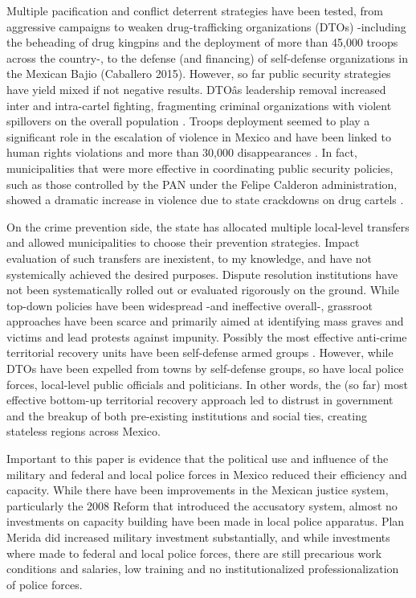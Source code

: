 \documentclass[12pt]{amsart}
\numberwithin{equation}{section}
\theoremstyle{definition}
\theoremstyle{definition}
\theoremstyle{definition}
\begin{document}
Multiple pacification and conflict deterrent strategies have been tested, from aggressive campaigns to weaken drug-trafficking organizations (DTOs) -including the beheading of drug kingpins and the deployment of more than 45,000 troops across the country-, to the defense (and financing) of self-defense organizations in the Mexican Bajio (Caballero 2015). However, so far public security strategies have yield mixed if not negative results. DTOâs leadership removal increased inter and intra-cartel fighting, fragmenting criminal organizations with violent spillovers on the overall population \citep{guerrero_2011}. Troops deployment seemed to play a significant role in the escalation of violence in Mexico \citep{escalante_2011} and have been linked to human rights violations and more than 30,000 disappearances \citep{daly_etal_2012, moloeznik_etal_2012, magaloni_magaloni_razu_2018}. In fact, municipalities that were more effective in coordinating public security policies, such as those controlled by the PAN under the Felipe Calderon administration, showed a dramatic increase in violence due to state crackdowns on drug cartels \citep{dell_2015}. 

On the crime prevention side, the state has allocated multiple local-level transfers and allowed municipalities to choose their prevention strategies. Impact evaluation of such transfers are inexistent, to my knowledge, and have not systemically achieved the desired purposes. Dispute resolution institutions have not been systematically rolled out or evaluated rigorously on the ground. While top-down policies have been widespread -and ineffective overall-, grassroot approaches have been scarce and primarily aimed at identifying mass graves and victims and lead protests against impunity. Possibly the most effective anti-crime territorial recovery units have been self-defense armed groups \citep{ch_2020}. However, while DTOs have been expelled from towns by self-defense groups, so have local police forces, local-level public officials and politicians. In other words, the (so far) most effective bottom-up territorial recovery approach led to distrust in government and the breakup of both pre-existing institutions and social ties, creating stateless regions across Mexico. 

Important to this paper is evidence that the political use and influence of the military \citep{aguayo_2001, moloeznik_2010, lopez_gonzalez_2012} and federal and local police forces in Mexico \citep{zepeda_2010, sabet_2012, lopez_portillo_2012, davis_2017} reduced their efficiency and capacity. While there have been improvements in the Mexican justice system, particularly the 2008 Reform that introduced the accusatory system, almost no investments on capacity building have been made in local police apparatus. Plan Merida did increased military investment substantially, and while investments where made to federal and local police forces, there are still precarious work conditions and salaries, low training and no institutionalized professionalization of police forces. 
\end{document}
